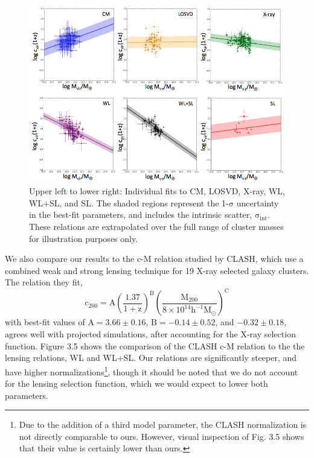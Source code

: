 \begin{figure}[h!]
\begin{center}
\includegraphics[width=\textwidth]{./images/CMRelationProject/FitToEachMethod.png}
\end{center}
\caption[Observed c-M Fits]{Upper left to lower right: Individual fits to CM, LOSVD, X-ray,
    WL, WL+SL, and SL. The shaded regions represent the 1-$\mathrm{\sigma}$ uncertainty
    in the best-fit parameters, and includes the intrinsic scatter, $\mathrm{\sigma_{int}}$. These
    relations are extrapolated over the full range of cluster masses for
    illustration purposes only. }
\end{figure}

We also compare our results to the c-M relation studied by CLASH, which use
a combined weak and strong lensing technique for 19 X-ray selected galaxy
clusters. The relation they fit,
\begin{equation}
\mathrm{c_{200} = A \left( \frac{1.37}{1+z} \right)^{B} \left(
    \frac{M_{200}}{8\times 10^{14} h^{-1} M_{\odot}} \right)^{C}}
\end{equation}
with best-fit values of $\mathrm{A=3.66\pm0.16}$, $\mathrm{B = -0.14\pm0.52}$,
and $\mathrm{-0.32\pm0.18}$, agrees well with projected simulations, after
accounting for the X-ray selection function. Figure 3.5 shows the comparison of
the CLASH c-M relation to the the lensing relations, WL and WL+SL. Our
relations are significantly steeper, and have higher
normalizations\footnote[2]{Due to the addition of a third model parameter, the 
  CLASH normalization is not directly comparable to ours. However, visual
  inspection of Fig. 3.5 shows that their value is certainly lower than ours.},
though it should be noted that we do not account for the lensing selection
function, which we would expect to lower both parameters.

